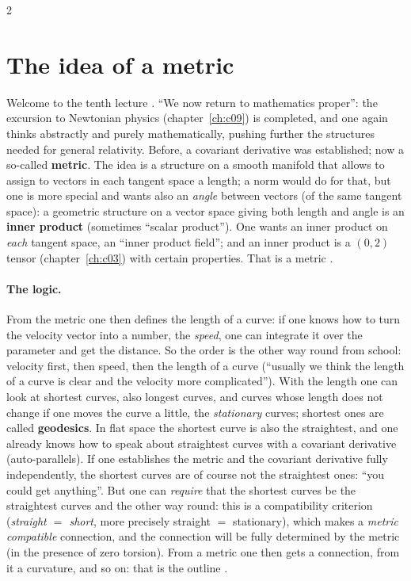 \begin{paracol}{2}
\section{The idea of a metric}\label{sec:c10-idea}

Welcome to the tenth lecture . ``We now return to mathematics proper'': the excursion to Newtonian physics (chapter~\ref{ch:c09}) is completed, and one again thinks abstractly and purely mathematically, pushing further the structures needed for general relativity. Before, a covariant derivative was established; now a so-called \textbf{metric}. The idea is a structure on a smooth manifold that allows to assign to vectors in each tangent space a length; a norm would do for that, but one is more special and wants also an \emph{angle} between vectors (of the same tangent space): a geometric structure on a vector space giving both length and angle is an \textbf{inner product} (sometimes ``scalar product''). One wants an inner product on \emph{each} tangent space, an ``inner product field''; and an inner product is a $(0,2)$ tensor (chapter~\ref{ch:c03}) with certain properties. That is a metric
.

\paragraph{The logic.} From the metric one then defines the length of a curve: if one knows how to turn the velocity vector into a number, the \emph{speed}, one can integrate it over the parameter and get the distance. So the order is the other way round from school: velocity first, then speed, then the length of a curve (``usually we think the length of a curve is clear and the velocity more complicated''). With the length one can look at shortest curves, also longest curves, and curves whose length does not change if one moves the curve a little, the \emph{stationary} curves; shortest ones are called \textbf{geodesics}.
In flat space the shortest curve is also the straightest, and one already knows how to speak about straightest curves with a covariant derivative (auto-parallels). If one establishes the metric and the covariant derivative fully independently, the shortest curves are of course not the straightest ones: ``you could get anything''. But one can \emph{require} that the shortest curves be the straightest curves and the other way round: this is a compatibility criterion (\emph{straight $=$ short}, more precisely straight $=$ stationary), which makes a \emph{metric compatible} connection, and the connection will be fully determined by the metric (in the presence of zero torsion). From a metric one then gets a connection, from it a curvature, and so on: that is the outline
.


\end{paracol}
